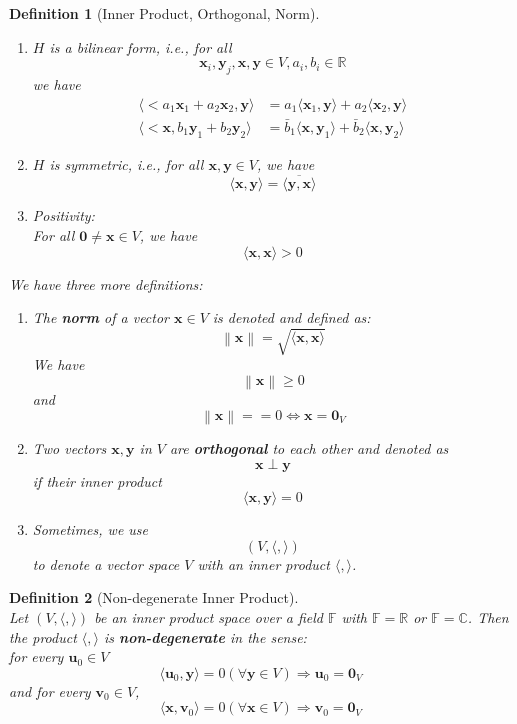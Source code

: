\documentclass[12pt]{article}
\newcommand\norm[1]{\left\lVert#1\right\rVert}
\newtheorem{definition}{Definition}[section]
\theoremstyle{definition}
\begin{document}
\begin{definition}[Inner Product, Orthogonal, Norm]
\[\]
\begin{enumerate}[label=(\arabic*)]
\item $H$ is a bilinear form, i.e., for all
\[
\mathbf{x}_i, \mathbf{y}_j, \mathbf{x}, \mathbf{y}\in V, a_i, b_i\in\mathbb{R}
\]
we have
\[
\begin{aligned}
\langle <a_1\mathbf{x}_1+a_2\mathbf{x}_2,\mathbf{y}\rangle &= a_1\langle \mathbf{x}_1, \mathbf{y}\rangle+a_2\langle \mathbf{x}_2, \mathbf{y}\rangle\\
\langle <\mathbf{x}, b_1\mathbf{y}_1+b_2\mathbf{y}_2\rangle &= \bar{b}_1\langle \mathbf{x}, \mathbf{y}_1\rangle+\bar{b}_2\langle \mathbf{x}, \mathbf{y}_2\rangle
\end{aligned}
\]
\item $H$ is symmetric, i.e., for all $\mathbf{x},\mathbf{y}\in V$, we have
\[
\langle \mathbf{x},\mathbf{y}\rangle = \overline{\langle \mathbf{y},\mathbf{x}\rangle}
\]
\item Positivity:\\
For all $\mathbf{0}\neq \mathbf{x}\in V$, we have
\[
\langle \mathbf{x},\mathbf{x}\rangle >0
\]
\end{enumerate}
We have three more definitions:
\begin{enumerate}[label=(\arabic*)]
\item The \textbf{norm} of a vector $\mathbf{x}\in V$ is denoted and defined as:
\[
\norm{\mathbf{x}}=\sqrt{\langle \mathbf{x},\mathbf{x}\rangle}
\]
We have
\[
\norm{\mathbf{x}}\geq 0
\]
and
\[
\norm{\mathbf{x}}==0\Leftrightarrow \mathbf{x}=\mathbf{0}_V
\]
\item Two vectors $\mathbf{x}, \mathbf{y}$ in $V$ are \textbf{orthogonal} to each other and denoted as
\[
\mathbf{x}\perp \mathbf{y}
\]
if their inner product
\[
\langle \mathbf{x}, \mathbf{y}\rangle = 0
\]
\item Sometimes, we use
\[
(V,\langle,\rangle)
\]
to denote a vector space $V$ with an inner product $\langle,\rangle$.
\end{enumerate}
\end{definition}
\begin{definition}[Non-degenerate Inner Product]
\hfill\\\normalfont Let $(V,\langle,\rangle)$ be an inner product space over a field $\mathbb{F}$ with $\mathbb{F}=\mathbb{R}$ or $\mathbb{F}=\mathbb{C}$. Then the product $\langle,\rangle$ is \textbf{non-degenerate} in the sense:\\
for every $\mathbf{u}_0\in V$
\[
\langle\mathbf{u}_0,\mathbf{y}\rangle = 0 (\forall \mathbf{y}\in V)\Rightarrow \mathbf{u}_0=\mathbf{0}_V
\]
and for every $\mathbf{v}_0\in V$,
\[
\langle\mathbf{x},\mathbf{v}_0\rangle = 0 (\forall \mathbf{x}\in V)\Rightarrow \mathbf{v}_0=\mathbf{0}_V
\]
\end{definition}
\end{document}
